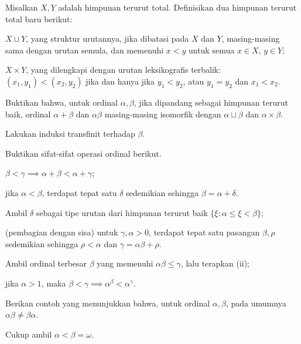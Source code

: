 \begin{Exercises}
	\item Misalkan $X, Y$ adalah himpunan terurut total. Definisikan dua himpunan terurut total baru berikut:
		\begin{compactenum}[(i)]
			\item $X \sqcup Y$, yang struktur urutannya, jika dibatasi pada $X$ dan $Y$, masing-masing sama dengan urutan semula, dan memenuhi $x < y$ untuk semua $x \in X$, $y \in Y$;
			\item $X \times Y$, yang dilengkapi dengan urutan leksikografis terbalik: $(x_1, y_1) < (x_2, y_2)$ jika dan hanya jika $y_1 < y_2$, atau $y_1=y_2$ dan $x_1 < x_2$.
		\end{compactenum}
		Buktikan bahwa, untuk ordinal $\alpha, \beta$, jika dipandang sebagai himpunan terurut baik, ordinal $\alpha + \beta$ dan $\alpha \beta$ masing-masing isomorfik dengan $\alpha \sqcup \beta$ dan $\alpha \times \beta$.
		\begin{hint} Lakukan induksi transfinit terhadap $\beta$. \end{hint}
	\item Buktikan sifat-sifat operasi ordinal berikut.
		\begin{compactenum}[(i)]
			\item $\beta < \gamma \implies \alpha + \beta < \alpha + \gamma$;
			\item jika $\alpha < \beta$, terdapat tepat satu $\delta$ sedemikian sehingga $\beta = \alpha + \delta$. \begin{hint} Ambil $\delta$ sebagai tipe urutan dari himpunan terurut baik $\{\xi : \alpha \leq \xi < \beta \}$;\end{hint}
			\item (pembagian dengan sisa) untuk $\gamma, \alpha > 0$, terdapat tepat satu pasangan $\beta, \rho$ sedemikian sehingga $\rho < \alpha$ dan $\gamma = \alpha \beta + \rho$. \begin{hint} Ambil ordinal terbesar $\beta$ yang memenuhi $\alpha\beta \leq \gamma$, lalu terapkan (ii); \end{hint}
			\item jika $\alpha > 1$, maka $\beta < \gamma \implies \alpha^\beta < \alpha^\gamma$.
		\end{compactenum}
	\item Berikan contoh yang menunjukkan bahwa, untuk ordinal $\alpha, \beta$, pada umumnya $\alpha \beta \neq \beta \alpha$. \begin{hint} Cukup ambil $\alpha < \beta = \omega$.\end{hint}

\end{Exercises}
